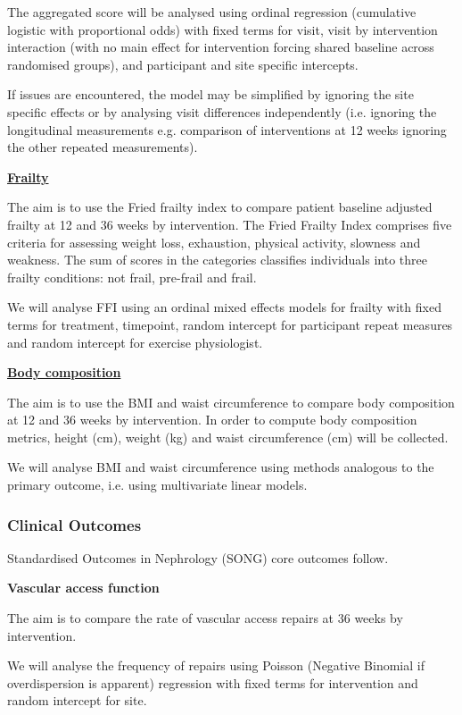 \documentclass[11pt,parskip=half-]{scrartcl}
\begin{document}
The aggregated score will be analysed using ordinal regression (cumulative logistic with proportional odds)  with fixed terms for visit, visit by intervention interaction (with no main effect for intervention forcing shared baseline across randomised groups), and participant and site specific  intercepts.

If issues are encountered, the model may be simplified by ignoring the site specific effects or by analysing visit differences independently (i.e. ignoring the longitudinal measurements e.g. comparison of interventions at 12 weeks ignoring the other repeated measurements).

\label{analysis:ffi}
\hyperref[outcome:ffi]{\textbf{Frailty}}

The aim is to use the Fried frailty index to compare patient baseline adjusted frailty at 12 and 36 weeks by intervention. The Fried Frailty Index comprises five criteria for assessing weight loss, exhaustion, physical activity, slowness and weakness. The sum of scores in the categories classifies individuals into three frailty conditions: not frail, pre-frail and frail.

We will analyse FFI using an ordinal mixed effects models for frailty with fixed terms for treatment, timepoint, random intercept for participant repeat measures and random intercept for exercise physiologist.

\label{analysis:body}
\hyperref[outcome:body]{\textbf{Body composition}}

The aim is to use the BMI and waist circumference to compare body composition at 12 and 36 weeks by intervention. In order to compute body composition metrics, height (cm), weight (kg) and waist circumference (cm) will be collected.

We will analyse BMI and waist circumference using methods analogous to the primary outcome, i.e. using multivariate linear models.

\subsubsection{Clinical Outcomes}\label{clinical-outcomes}

Standardised Outcomes in Nephrology (SONG) core outcomes follow.

\textbf{Vascular access function}

The aim is to compare the rate of vascular access repairs at 36 weeks by intervention.

We will analyse the frequency of repairs using Poisson (Negative Binomial if overdispersion is apparent) regression with fixed terms for intervention and random intercept for site.
\end{document}
